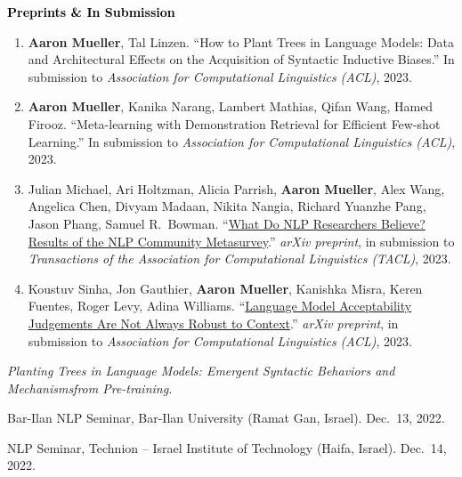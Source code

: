 \documentclass[10pt]{article}
\renewcommand{\section}[1]{\pagebreak[3]%
	\vspace{0.5\baselineskip}%
	\phantomsection\addcontentsline{toc}{section}{#1}%
	\noindent\llap{\bf\scshape\smash{\parbox[t]{\marginparwidth}{\hyphenpenalty=10000\raggedright \textcolor{black}{#1}}}}%
	\vspace{-\baselineskip}\par}
\renewcommand{\subsection}[1]{\textcolor{black}{#1}}
\providecommand*\titlelink[2]{\href{#1}{\textcolor{accent}{#2}}}
\begin{document}
	\subsection{\textbf{Preprints \& In Submission}}
	\begin{enumerate}[resume,leftmargin=*, topsep=0pt, itemsep=0.25ex, partopsep=0ex, parsep=1ex]
	\item \textbf{Aaron Mueller}, Tal Linzen. ``How to Plant Trees in Language Models: Data and Architectural Effects on the Acquisition of Syntactic Inductive Biases.'' In submission to \emph{Association for Computational Linguistics (ACL)}, 2023.
	
	\item \textbf{Aaron Mueller}, Kanika Narang, Lambert Mathias, Qifan Wang, Hamed Firooz. ``Meta-learning with Demonstration Retrieval for Efficient Few-shot Learning.'' In submission to \textit{Association for Computational Linguistics (ACL)}, 2023.\label{pub:metalearn}
	
	\item Julian Michael, Ari Holtzman, Alicia Parrish, \textbf{Aaron Mueller}, Alex Wang, Angelica Chen, Divyam Madaan, Nikita Nangia, Richard Yuanzhe Pang, Jason Phang, Samuel R.\ Bowman. ``\titlelink{https://arxiv.org/abs/2208.12852}{What Do NLP Researchers Believe? Results of the NLP Community Metasurvey}.'' \emph{arXiv preprint}, in submission to \emph{Transactions of the Association for Computational Linguistics (TACL)}, 2023.
	
	\item Koustuv Sinha, Jon Gauthier, \textbf{Aaron Mueller}, Kanishka Misra, Keren Fuentes, Roger Levy, Adina Williams. ``\titlelink{https://arxiv.org/abs/2212.08979}{Language Model Acceptability Judgements Are Not Always Robust to Context}.'' \emph{arXiv preprint}, in submission to \emph{Association for Computational Linguistics (ACL)}, 2023.
 
	\end{enumerate}

	\section{Invited\\Talks}
	\emph{Planting Trees in Language Models: Emergent Syntactic Behaviors and Mechanisms\newline from Pre-training.}
	\begin{innerlist}
		\item Bar-Ilan NLP Seminar, Bar-Ilan University (Ramat Gan, Israel). Dec.\ 13, 2022.
		\item NLP Seminar, Technion -- Israel Institute of Technology (Haifa, Israel). Dec.\ 14, 2022.
	\end{innerlist}
\end{document}
